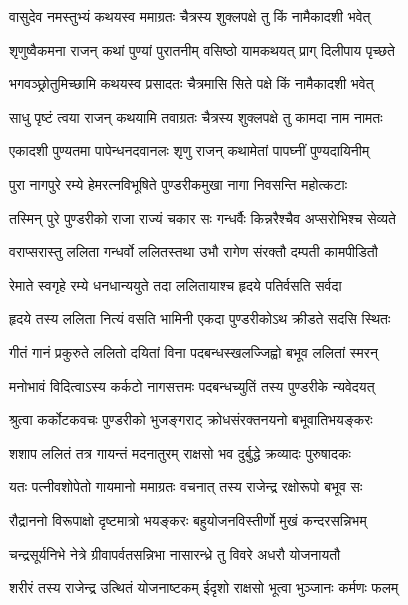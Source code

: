 \twolineshloka
{वासुदेव नमस्तुभ्यं कथयस्व ममाग्रतः}
{चैत्रस्य शुक्लपक्षे तु किं नामैकादशी भवेत्}%


\twolineshloka
{शृणुष्वैकमना राजन् कथां पुण्यां पुरातनीम्}
{वसिष्ठो यामकथयत् प्राग् दिलीपाय पृच्छते}%


\twolineshloka
{भगवञ्छ्रोतुमिच्छामि कथयस्व प्रसादतः}
{चैत्रमासि सिते पक्षे किं नामैकादशी भवेत्}%


\twolineshloka
{साधु पृष्टं त्वया राजन् कथयामि तवाग्रतः}
{चैत्रस्य शुक्लपक्षे तु कामदा नाम नामतः}%

\twolineshloka
{एकादशी पुण्यतमा पापेन्धनदवानलः}
{शृणु राजन् कथामेतां पापघ्नीं पुण्यदायिनीम्}%

\twolineshloka
{पुरा नागपुरे रम्ये हेमरत्नविभूषिते}
{पुण्डरीकमुखा नागा निवसन्ति महोत्कटाः}%

\twolineshloka
{तस्मिन् पुरे पुण्डरीको राजा राज्यं चकार सः}
{गन्धर्वैः किन्नरैश्चैव अप्सरोभिश्च सेव्यते}%

\twolineshloka
{वराप्सरास्तु ललिता गन्धर्वो ललितस्तथा}
{उभौ रागेण संरक्तौ दम्पती कामपीडितौ}%

\twolineshloka
{रेमाते स्वगृहे रम्ये धनधान्ययुते तदा}
{ललितायाश्च हृदये पतिर्वसति सर्वदा}%

\twolineshloka
{हृदये तस्य ललिता नित्यं वसति भामिनी}
{एकदा पुण्डरीकोऽथ क्रीडते सदसि स्थितः}%

\twolineshloka
{गीतं गानं प्रकुरुते ललितो दयितां विना}
{पदबन्धस्खलज्जिह्वो बभूव ललितां स्मरन्}%

\twolineshloka
{मनोभावं विदित्वाऽस्य कर्कटो नागसत्तमः}
{पदबन्धच्युतिं तस्य पुण्डरीके न्यवेदयत्}%

\twolineshloka
{श्रुत्वा कर्कोटकवचः पुण्डरीको भुजङ्गराट्}
{क्रोधसंरक्तनयनो बभूवातिभयङ्करः}%

\twolineshloka
{शशाप ललितं तत्र गायन्तं मदनातुरम्}
{राक्षसो भव दुर्बुद्धे क्रव्यादः पुरुषादकः}%

\twolineshloka
{यतः पत्नीवशोपेतो गायमानो ममाग्रतः}
{वचनात् तस्य राजेन्द्र रक्षोरूपो बभूव सः}%

\twolineshloka
{रौद्राननो विरूपाक्षो दृष्टमात्रो भयङ्करः}
{बहुयोजनविस्तीर्णो मुखं कन्दरसन्निभम्}%

\twolineshloka
{चन्द्रसूर्यनिभे नेत्रे ग्रीवापर्वतसन्निभा}
{नासारन्ध्रे तु विवरे अधरौ योजनायतौ}%

\twolineshloka
{शरीरं तस्य राजेन्द्र उत्थितं योजनाष्टकम्}
{ईदृशो राक्षसो भूत्वा भुञ्जानः कर्मणः फलम्}%

